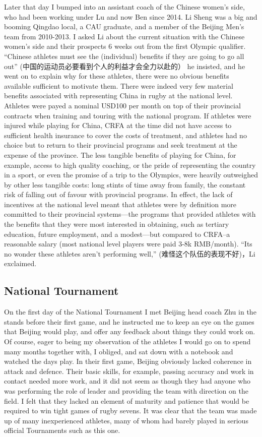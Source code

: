 \begin{CJK}{UTF8}{gbsn}
Later that day I bumped into an assistant coach of the Chinese women's side, who had been working under Lu and now Ben since 2014.  Li Sheng was a big and booming Qingdao local, a CAU graduate, and a member of the Beijing Men's team from 2010-2013.  I asked Li about the current situation with the Chinese women's side and their prospects 6 weeks out from the first Olympic qualifier.  ``Chinese athletes must see the (individual) benefits if they are going to go all out'' (中国的运动员必要看到个人的利益才会全力以赴的） he insisted, and he went on to explain why for these athletes, there were no obvious benefits available sufficient to motivate them.  There were indeed very few material benefits associated with representing China in rugby at the national level.  Athletes were payed a nominal USD100 per month on top of their provincial contracts when training and touring with the national program.  If athletes were injured while playing for China, CRFA at the time did not have access to sufficient health insurance to cover the costs of treatment, and athletes had no choice but to return to their provincial programs and seek treatment at the expense of the province.  The less tangible benefits of playing for China, for example, access to high quality coaching, or the pride of representing the country in a sport, or even the promise of a trip to the Olympics, were heavily outweighed by other less tangible costs: long stints of time away from family, the constant risk of falling out of favour with provincial programs.  In effect, the lack of incentives at the national level meant that athletes were by definition more committed to their provincial systems---the programs that provided athletes with the benefits that they were most interested in obtaining, such as tertiary education, future employment, and a modest---but compared to CRFA--a reasonable salary (most national level players were paid 3-8k RMB/month). ``Its no wonder these athletes aren't performing well,'' (难怪这个队伍的表现不好)，Li exclaimed.

\subsection{National Tournament}
On the first day of the National Tournament I met Beijing head coach Zhu in the stands before their first game, and he instructed me to keep an eye on the games that Beijing would play, and offer any feedback about things they could work on.  Of course, eager to being my observation of the athletes I would go on to spend many months together with, I obliged, and sat down with a notebook and watched the days play.  In their first game, Beijing obviously lacked coherence in attack and defence.  Their basic skills, for example, passing accuracy and work in contact needed more work, and it did not seem as though they had anyone who was performing the role of leader and providing the team with direction on the field.  I felt that they lacked an element of maturity and patience that would be required to win tight games of rugby sevens. It was clear that the team was made up of many inexperienced athletes, many of whom had barely played in serious official Tournaments such as this one.


\end{CJK}
